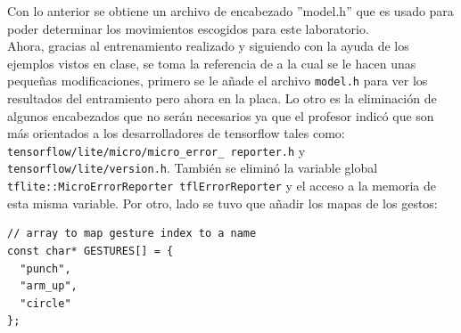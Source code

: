 Con lo anterior se obtiene un archivo de encabezado ''model.h'' que es usado para poder determinar los movimientos escogidos para este laboratorio.\\

Ahora, gracias al entrenamiento realizado y siguiendo con la ayuda de los ejemplos vistos en clase, se toma la referencia de \cite{ArduinoSketches1} a la cual se le hacen unas pequeñas modificaciones, primero se le añade el archivo \texttt{model.h} para ver los resultados del entramiento pero ahora en la placa.
Lo otro es la eliminación de algunos encabezados que no serán necesarios ya que el profesor indicó que son más orientados a los desarrolladores de tensorflow tales como: \texttt{tensorflow/lite/micro/micro\_error\_ reporter.h} y \texttt{tensorflow/lite/version.h}. También se eliminó la variable global \texttt{tflite::MicroErrorReporter tflErrorReporter} y el acceso a la memoria de esta misma variable. Por otro, lado se tuvo que añadir los mapas de los gestos:\newpage
\begin{lstlisting}[label={mini_bloque}, caption={Nombre de los archivos csv}]
// array to map gesture index to a name
const char* GESTURES[] = {
  "punch",
  "arm_up",
  "circle"
};
\end{lstlisting}

